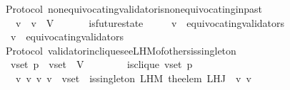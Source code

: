 \begin{isabellebody}
\isanewline
\isanewline
{}\isamarkupfalse%
\ {\isacharparenleft}\ Protocol{\isacharparenright}\ non{\isacharunderscore}equivocating{\isacharunderscore}validator{\isacharunderscore}is{\isacharunderscore}non{\isacharunderscore}equivocating{\isacharunderscore}in{\isacharunderscore}past\ {\isacharcolon}\isanewline
\ \ {\isachardoublequoteopen}{\isasymforall}\ {\isasymsigma}\ v\ {\isasymsigma}{\isacharprime}{\isachardot}\ v\ {\isasymin}\ V\ {\isasymand}\ {\isacharbraceleft}{\isasymsigma}{\isacharcomma}\ {\isasymsigma}{\isacharprime}{\isacharbraceright}\ {\isasymsubseteq}\ {\isasymSigma}\ {\isasymand}\ is{\isacharunderscore}future{\isacharunderscore}state\ {\isacharparenleft}{\isasymsigma}{\isacharprime}{\isacharcomma}\ {\isasymsigma}{\isacharparenright}\isanewline
\ \ {\isasymlongrightarrow}\ v\ {\isasymnotin}\ equivocating{\isacharunderscore}validators\ {\isasymsigma}\isanewline
\ \ {\isasymlongrightarrow}\ v\ {\isasymnotin}\ equivocating{\isacharunderscore}validators\ {\isasymsigma}{\isacharprime}{\isachardoublequoteclose}\isanewline
%
\isadelimproof
\ \ %
\endisadelimproof
%
\isatagproof
{}\isamarkupfalse%
%
\endisatagproof
{\isafoldproof}%
%
\isadelimproof
\isanewline
%
\endisadelimproof
\isanewline
{}\isamarkupfalse%
\ {\isacharparenleft}\ Protocol{\isacharparenright}\ validator{\isacharunderscore}in{\isacharunderscore}clique{\isacharunderscore}see{\isacharunderscore}L{\isacharunderscore}H{\isacharunderscore}M{\isacharunderscore}of{\isacharunderscore}others{\isacharunderscore}is{\isacharunderscore}singleton\ {\isacharcolon}\ \isanewline
\ \ {\isachardoublequoteopen}{\isasymforall}\ v{\isacharunderscore}set\ p\ {\isasymsigma}{\isachardot}\ v{\isacharunderscore}set\ {\isasymsubseteq}\ V\ {\isasymand}\ {\isasymsigma}\ {\isasymin}\ {\isasymSigma}\ \isanewline
\ \ {\isasymlongrightarrow}\ is{\isacharunderscore}clique\ {\isacharparenleft}v{\isacharunderscore}set{\isacharcomma}\ p{\isacharcomma}\ {\isasymsigma}{\isacharparenright}\ \isanewline
\ \ {\isasymlongrightarrow}\ {\isacharparenleft}{\isasymforall}\ v\ v{\isacharprime}{\isachardot}\ {\isacharbraceleft}v{\isacharcomma}\ v{\isacharprime}{\isacharbraceright}\ {\isasymsubseteq}\ v{\isacharunderscore}set\ {\isasymlongrightarrow}\ is{\isacharunderscore}singleton\ {\isacharparenleft}L{\isacharunderscore}H{\isacharunderscore}M\ {\isacharparenleft}the{\isacharunderscore}elem\ {\isacharparenleft}L{\isacharunderscore}H{\isacharunderscore}J\ {\isasymsigma}\ v{\isacharparenright}{\isacharparenright}\ v{\isacharprime}{\isacharparenright}{\isacharparenright}{\isachardoublequoteclose}\isanewline

\end{isabellebody}
